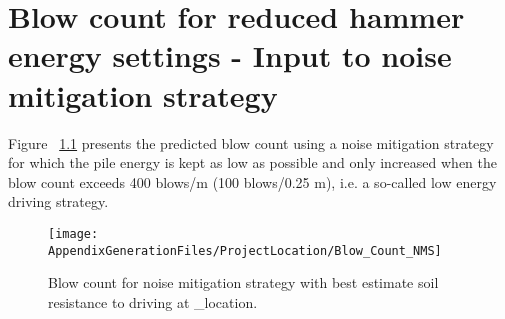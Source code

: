 \chapter{Blow count for reduced hammer energy settings - Input to noise mitigation strategy}\label{sec_1}

Figure ~\ref{blow_count_Noise} presents the predicted blow count using a noise mitigation strategy
for which the pile energy is kept as low as possible and only increased when the
blow count exceeds 400 blows/m (100 blows/0.25 m), i.e. a so-called low
energy driving strategy.


\begin{figure}[!htbp]
\texttt{[image: AppendixGenerationFiles/ProjectLocation/Blow\_Count\_NMS]}
\caption{Blow count for noise mitigation strategy with best estimate soil resistance to driving at  {\ID_location}.}
\label{blow_count_Noise}\end{figure}

\newpage


